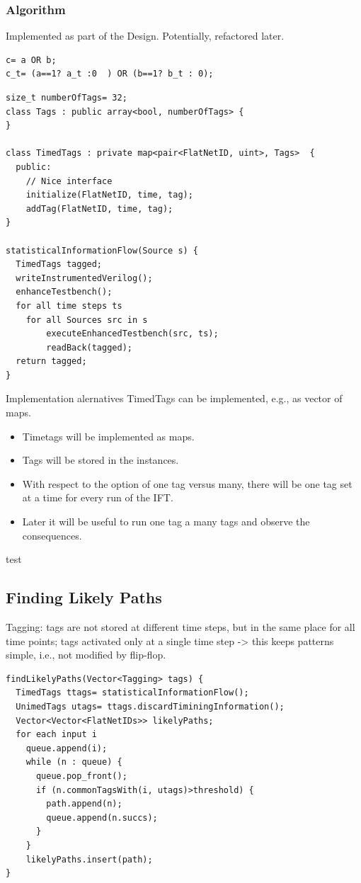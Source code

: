 \subsubsection{Algorithm}
Implemented as part of the Design. Potentially, refactored later.

\begin{verbatim}
c= a OR b;
c_t= (a==1? a_t :0  ) OR (b==1? b_t : 0);
\end{verbatim}

\begin{verbatim}
size_t numberOfTags= 32;
class Tags : public array<bool, numberOfTags> {
}

class TimedTags : private map<pair<FlatNetID, uint>, Tags>  {
  public:
    // Nice interface
    initialize(FlatNetID, time, tag);
    addTag(FlatNetID, time, tag);
}

statisticalInformationFlow(Source s) {
  TimedTags tagged;
  writeInstrumentedVerilog();
  enhanceTestbench();
  for all time steps ts
    for all Sources src in s
        executeEnhancedTestbench(src, ts);
        readBack(tagged);
  return tagged;
}
\end{verbatim}

Implementation alernatives TimedTags can be implemented, e.g., as vector of maps.

   \begin{itemize}
      \item Timetags will be implemented as maps.
      \item Tags will be stored in the instances.
      \item With respect to the option of one tag versus many, there will be one tag set at a time for every run of the IFT.  
      \item Later it will be useful to run one tag a many tags and observe the consequences.
   \end{itemize}
\newpage


test

\subsection{Finding Likely Paths}
Tagging: tags are not stored at different time steps, but in the same place for all time points; tags activated only at a single time step -> this keeps patterns simple, i.e., not modified by flip-flop.


\begin{verbatim}
findLikelyPaths(Vector<Tagging> tags) {
  TimedTags ttags= statisticalInformationFlow();
  UnimedTags utags= ttags.discardTiminingInformation();
  Vector<Vector<FlatNetIDs>> likelyPaths;
  for each input i
    queue.append(i);
    while (n : queue) {
      queue.pop_front();
      if (n.commonTagsWith(i, utags)>threshold) {
        path.append(n);
        queue.append(n.succs);
      }
    }
    likelyPaths.insert(path);
}
\end{verbatim}

